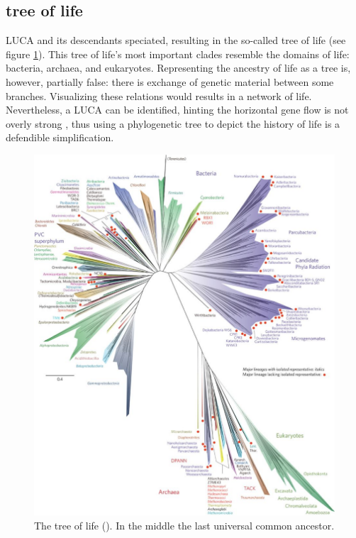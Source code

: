 {  \subsection{tree of life}

  LUCA and its descendants speciated, resulting in the so-called
  tree of life (see figure \ref{fig:tree_of_life}). This tree
  of life's most important clades resemble the domains of life:
  bacteria, archaea, and eukaryotes. Representing the ancestry of
  life as a tree is, however, partially false: there is exchange
  of genetic material between some branches. Visualizing these
  relations would results in a network of life. Nevertheless,
  a LUCA can be identified, hinting the horizontal gene flow is
  not overly strong \cite{theobald2010formal},
  thus using a phylogenetic tree to depict the history of life 
  is a defendible simplification.

  \begin{figure}[H]
    \includegraphics[height=0.5\textheight]{tree_of_life_2016.jpg}
    \caption{
      The tree of life (\cite{hug2016new}). 
      In the middle the last universal common ancestor.
    }
    \label{fig:tree_of_life}
  \end{figure}
\fi

}
